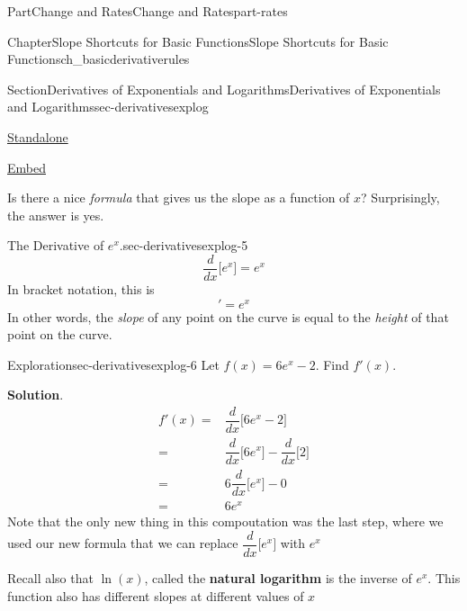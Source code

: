 \documentclass[oneside,10pt,]{tufte-book}
\newcommand{\blocktitlefont}{\relax}
\newcommand{\terminology}[1]{\textbf{#1}}
\numberwithin{equation}{chapter}
\newcommand{\ddx}[1]{ \dfrac{d}{dx} \Big[ #1 \Big]  }
\newcommand{\amp}{&}
\begin{document}
\begin{partptx}{Part}{Change and Rates}{}{Change and Rates}{}{}{part-rates}
\begin{chapterptx}{Chapter}{Slope Shortcuts for Basic Functions}{}{Slope Shortcuts for Basic Functions}{}{}{ch_basicderivativerules}
\begin{sectionptx}{Section}{Derivatives of Exponentials and Logarithms}{}{Derivatives of Exponentials and Logarithms}{}{}{sec-derivativesexplog}
\begin{sidebyside}{2}{0.075}{0.075}{0.17}
\begin{sbspanel}{0.21}
\href{http://webwork.bridgew.edu/oer/functions_at_work/sec-derivativesexplog-4-3.html}{Standalone}%
\par
\href{http://webwork.bridgew.edu/oer/functions_at_work/sec-derivativesexplog-4-3-if.html}{Embed}%
\end{sbspanel}%
\end{sidebyside}%
 Is there a nice \emph{formula} that gives us the slope as a function of \(x\)?  Surprisingly, the answer is yes.%
\begin{paragraphs}{The Derivative of \(e^x\).}{sec-derivativesexplog-5}%
%
\begin{equation*}
\ddx{e^x} = e^x
\end{equation*}
In bracket notation, this is%
\begin{equation*}
[e^x ]' = e^x
\end{equation*}
In other words, the \emph{slope} of any point on the curve is equal to the \emph{height} of that point on the curve.\end{paragraphs}%
\begin{exploration}{Exploration}{}{sec-derivativesexplog-6}%
Let \(f(x) = 6e^x - 2\). Find \(f'(x)\).%
\par\smallskip%
\noindent\textbf{\blocktitlefont Solution}.\hypertarget{sec-derivativesexplog-6-2}{}\quad{}%
\begin{align*}
f'(x) = \amp \ddx{ 6e^x - 2 }\\
= \amp \ddx{6e^x} - \ddx{2} \\
= \amp 6\ddx{e^x} - 0\\
= \amp 6 e^x 
\end{align*}
Note that the only new thing in this compoutation was the last step, where we used our new formula that we can replace \(\ddx{e^x}\) with \(e^x\)%
\end{exploration}%
Recall also that \(\ln(x)\), called the \terminology{natural logarithm} is the inverse of \(e^x\).  This function also has different slopes at different values of \(x\) \begin{sidebyside}{2}{0.075}{0.075}{0.17}%
\begin{sbspanel}{0.47}%

\end{sbspanel}
\end{sidebyside}
\end{sectionptx}
\end{chapterptx}
\end{partptx}
\end{document}
